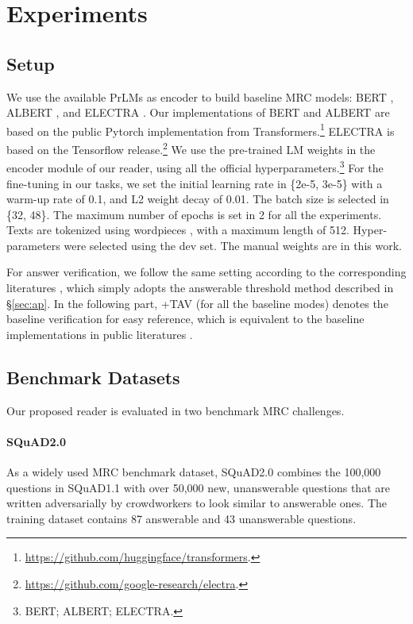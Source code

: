\documentclass[letterpaper]{article} \usepackage{aaai21}  \usepackage{times}  \usepackage{helvet} \usepackage{courier}  \usepackage[hyphens]{url}  \usepackage{graphicx}
\begin{document}
\section{Experiments}
\subsection{Setup}
We use the available PrLMs as encoder to build baseline MRC models: BERT \cite{devlin2018bert}, ALBERT \cite{Lan2020ALBERT}, and ELECTRA \cite{clark2019electra}. Our implementations of BERT and ALBERT are based on the public Pytorch implementation from Transformers.\footnote{\url{https://github.com/huggingface/transformers}.} ELECTRA is based on the Tensorflow release.\footnote{\url{https://github.com/google-research/electra}.} We use the pre-trained LM weights in the encoder module of our reader, using all the official hyperparameters.\footnote{BERT; ALBERT; ELECTRA.} For the fine-tuning in our tasks, we set the initial learning rate in \{2e-5, 3e-5\} with a warm-up rate of 0.1, and L2 weight decay of 0.01. The batch size is selected in \{32, 48\}. The maximum number of epochs is set in 2 for all the experiments. Texts are tokenized using wordpieces \cite{wu2016google}, with a maximum length of 512. Hyper-parameters were selected using the dev set. The manual weights are   in this work.



For answer verification, we follow the same setting according to the corresponding literatures \cite{devlin2018bert,Lan2020ALBERT,clark2019electra}, which simply adopts the answerable threshold method described in \S\ref{sec:ap}. In the following part, +TAV (for all the baseline modes) denotes the baseline verification for easy reference, which is equivalent to the baseline implementations in public literatures \cite{devlin2018bert,Lan2020ALBERT,clark2019electra}.

\subsection{Benchmark Datasets}
Our proposed reader is evaluated in two benchmark MRC challenges.
\paragraph{SQuAD2.0}
As a widely used MRC benchmark dataset, 
SQuAD2.0  \cite{Rajpurkar2018Know} combines the 100,000 questions in SQuAD1.1 \cite{Rajpurkar2016SQuAD} with over 50,000 new, unanswerable questions that are written adversarially by crowdworkers to look similar to answerable ones. 
The training dataset contains 87 answerable and 43 unanswerable questions.
\end{document}
